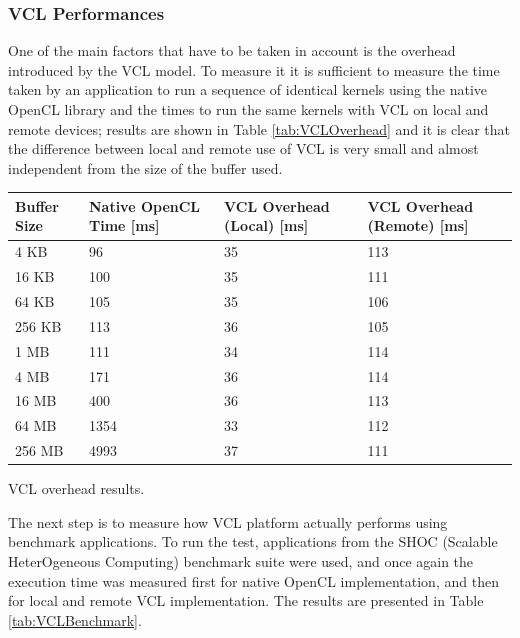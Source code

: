 \subsubsection{VCL Performances}
One of the main factors that have to be taken in account is the overhead introduced by the VCL model. To measure it it is sufficient to measure the time taken by an application to run a sequence of identical kernels using the native OpenCL library and the times to run the same kernels with VCL on local and remote devices; results are shown in Table \ref{tab:VCLOverhead} and it is clear that the difference between local and remote use of VCL is very small and almost independent from the size of the buffer used.\\

\begin{tablehere}
{\footnotesize
\begin{tabular}{|p{}|p{}|p{}|p{}|}\hline
\textbf{Buffer Size} & \textbf{Native OpenCL Time} [ms] & \textbf{VCL Overhead (Local)} [ms] & \textbf{VCL Overhead (Remote)} [ms]\\ \hline
4 KB & 96 & 35 & 113 \\ \hline
16 KB & 100 & 35 & 111 \\ \hline
64 KB & 105 & 35 & 106 \\ \hline
256 KB & 113 & 36 & 105 \\ \hline
1 MB & 111 & 34 & 114 \\ \hline
4 MB & 171 & 36 & 114 \\ \hline
16 MB & 400 & 36 & 113 \\ \hline
64 MB & 1354 & 33 & 112 \\ \hline
256 MB & 4993 & 37 & 111 \\ \hline
\end{tabular}}
  \caption{VCL overhead results.}
	\label{tab:VCLOverhead}
\end{tablehere}

The next step is to measure how VCL platform actually performs using benchmark applications. To run the test, applications from the SHOC (Scalable HeterOgeneous Computing) benchmark suite were used, and once again the execution time was measured first for native OpenCL implementation, and then for local and remote VCL implementation. The results are presented in Table \ref{tab:VCLBenchmark}.\\

